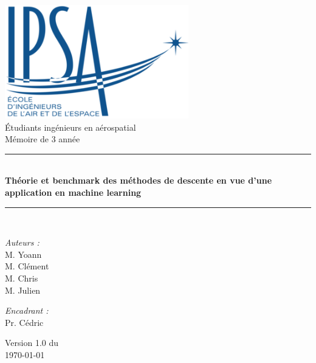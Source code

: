 \documentclass[a4paper,12pt,calibri,oneside,openany]{book}
\theoremstyle{break}
\begin{document}
\renewcommand{\bibname}{Bibliographie et Webographie}

\begin{titlepage}
\begin{center}

\includegraphics[width=0.6\textwidth]{ipsa}\\[1cm]

{\large Étudiants ingénieurs en aérospatial}\\[0.5cm]

{\large Mémoire de 3 année}\\[0.5cm]

\rule{\linewidth}{0.5mm} \\[0.4cm]
{ \huge \bfseries Théorie et benchmark des méthodes de descente en vue d'une application en machine learning\\[0.4cm] }
\rule{\linewidth}{0.5mm} \\[1.5cm]

\noindent
\begin{minipage}{0.4\textwidth}
  \begin{flushleft} \large
    \emph{Auteurs :}\\
    M.  Yoann\\
    M.  Clément\\
    M.  Chris\\
    M.  Julien
  \end{flushleft}
\end{minipage}%
\begin{minipage}{0.4\textwidth}
  \begin{flushright} \large
    \emph{Encadrant :} \\
    Pr.  Cédric\\
  \end{flushright}
\end{minipage}

\vfill

{\large Version 1.0 du\\ \today}

\end{center}
\end{titlepage}
\end{document}

